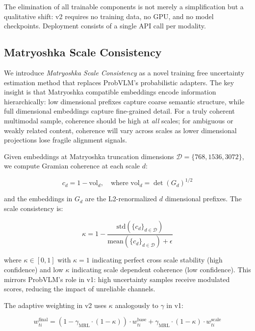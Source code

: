 \documentclass[a4paper,fleqn]{cas-sc}
\begin{document}
\begin{itemize}
The elimination of all trainable components is not merely a simplification but a qualitative shift: v2 requires no training data, no GPU, and no model checkpoints. Deployment consists of a single API call per modality.

\subsection{Matryoshka Scale Consistency}\label{sec:v2-matryoshka}

We introduce \emph{Matryoshka Scale Consistency} as a novel training free uncertainty estimation method that replaces ProbVLM's probabilistic adapters. The key insight is that Matryoshka compatible embeddings encode information hierarchically: low dimensional prefixes capture coarse semantic structure, while full dimensional embeddings capture fine-grained detail. For a truly coherent multimodal sample, coherence should be high at \emph{all} scales; for ambiguous or weakly related content, coherence will vary across scales as lower dimensional projections lose fragile alignment signals.

Given embeddings at Matryoshka truncation dimensions $\mathcal{D} = \{768,  1536,  3072\}$, we compute Gramian coherence at each scale $d$:

\begin{equation}\label{eq:v2-scale-coherence}
c_d = 1 - \mathrm{vol}_d, \quad \text{where } \mathrm{vol}_d = \det(G_d)^{1/2}
\end{equation}

and the embeddings in $G_d$ are the L2-renormalized $d$ dimensional prefixes. The scale consistency is:

\begin{equation}\label{eq:v2-kappa}
\kappa = 1 - \frac{\mathrm{std}(\{c_d\}_{d \in \mathcal{D}})}{\mathrm{mean}(\{c_d\}_{d \in \mathcal{D}}) + \epsilon}
\end{equation}

where $\kappa \in [0, 1]$ with $\kappa = 1$ indicating perfect cross scale stability (high confidence) and low $\kappa$ indicating scale dependent coherence (low confidence). This mirrors ProbVLM's role in v1: high uncertainty samples receive modulated scores, reducing the impact of unreliable channels.

The adaptive weighting in v2 uses $\kappa$ analogously to $\gamma$ in v1:

\begin{equation}\label{eq:v2-adaptive}
w_{ti}^{\mathrm{final}} = (1 - \gamma_{\mathrm{MRL}} \cdot (1 - \kappa)) \cdot w_{ti}^{\mathrm{base}} + \gamma_{\mathrm{MRL}} \cdot (1 - \kappa) \cdot w_{ti}^{\mathrm{scale}}
\end{equation}


\end{itemize}
\end{document}
